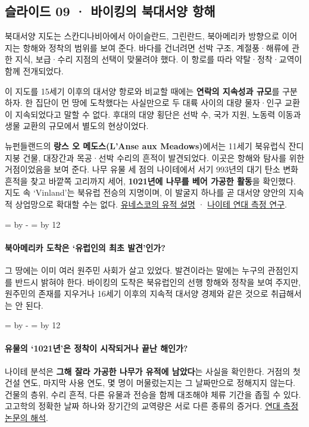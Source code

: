 \documentclass[10pt,a4paper]{article}
\newcommand{\ReserveQuestionSpace}{%
  \par\begingroup
  \dimen0=\pagegoal \advance\dimen0 by -\pagetotal
  \dimen2=\baselineskip \multiply\dimen2 by 12
  \ifdim\dimen0<\dimen2 \newpage\fi
  \endgroup}
\begin{document}
\subsection{슬라이드 09 · 바이킹의 북대서양 항해}
북대서양 지도는 스칸디나비아에서 아이슬란드, 그린란드, 북아메리카 방향으로 이어지는 항해와 정착의 범위를 보여 준다. 바다를 건너려면 선박 구조, 계절풍·해류에 관한 지식, 보급·수리 지점의 선택이 맞물려야 했다. 이 항로를 따라 약탈·정착·교역이 함께 전개되었다.\par

이 지도를 15세기 이후의 대서양 항로와 비교할 때에는 \textbf{연락의 지속성과 규모}를 구분하자. 한 집단이 먼 땅에 도착했다는 사실만으로 두 대륙 사이의 대량 물자·인구 교환이 지속되었다고 말할 수 없다. 후대의 대양 횡단은 선박 수, 국가 지원, 노동력 이동과 생물 교환의 규모에서 별도의 현상이었다.\par

뉴펀들랜드의 \textbf{랑스 오 메도스(L’Anse aux Meadows)}에서는 11세기 북유럽식 잔디 지붕 건물, 대장간과 목공·선박 수리의 흔적이 발견되었다. 이곳은 항해와 탐사를 위한 거점이었음을 보여 준다. 나무 유물 세 점의 나이테에서 서기 993년의 대기 탄소 변화 흔적을 찾고 바깥쪽 고리까지 세어, \textbf{1021년에 나무를 베어 가공한 활동}을 확인했다. 지도 속 ‘Vinland’는 북유럽 전승의 지명이며, 이 발굴지 하나를 곧 대서양 양안의 지속적 상업망으로 확대할 수는 없다. \href{https://whc.unesco.org/en/list/4}{유네스코의 유적 설명} · \href{https://www.nature.com/articles/s41586-021-03972-8}{나이테 연대 측정 연구}.\par

\ReserveQuestionSpace
\paragraph{북아메리카 도착은 ‘유럽인의 최초 발견’인가?}
그 땅에는 이미 여러 원주민 사회가 살고 있었다. 발견이라는 말에는 누구의 관점인지를 반드시 밝혀야 한다. 바이킹의 도착은 북유럽인의 선행 항해와 정착을 보여 주지만, 원주민의 존재를 지우거나 16세기 이후의 지속적 대서양 경제와 같은 것으로 취급해서는 안 된다.\par

\ReserveQuestionSpace
\paragraph{유물의 ‘1021년’은 정착이 시작되거나 끝난 해인가?}
나이테 분석은 \textbf{그해 잘라 가공한 나무가 유적에 남았다}는 사실을 확인한다. 거점의 첫 건설 연도, 마지막 사용 연도, 몇 명이 머물렀는지는 그 날짜만으로 정해지지 않는다. 건물의 층위, 수리 흔적, 다른 유물과 전승을 함께 대조해야 체류 기간을 좁힐 수 있다. 고고학의 정확한 날짜 하나와 장기간의 교역량은 서로 다른 종류의 증거다. \href{https://www.nature.com/articles/s41586-021-03972-8}{연대 측정 논문의 해석}.\par
\end{document}
